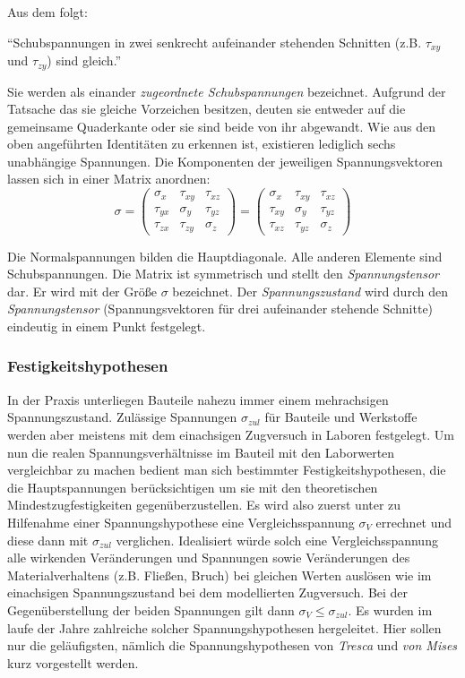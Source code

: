 \documentclass[12pt,a4paper,parskip,twoside,BCOR5mm,headsepline]{scrartcl}
\begin{document}
\begin{description*}
Aus dem folgt:

"`Schubspannungen in zwei senkrecht aufeinander stehenden Schnitten (z.B. $\tau_{xy}$ und $\tau_{zy}$) sind gleich."'\autocite[46]{tmr}

Sie werden als einander \emph{zugeordnete Schubspannungen} bezeichnet. Aufgrund der Tatsache das sie gleiche Vorzeichen besitzen, deuten sie entweder auf die gemeinsame Quaderkante oder sie sind beide von ihr abgewandt. Wie aus den oben angeführten Identitäten zu erkennen ist, existieren lediglich sechs unabhängige Spannungen. Die Komponenten der jeweiligen Spannungsvektoren lassen sich in einer Matrix anordnen:
\begin{equation}
\sigma = \begin{pmatrix}
\sigma_x & \tau_{xy} & \tau_{xz}\\
\tau_{yx} & \sigma_y & \tau_{yz}\\
\tau_{zx} & \tau_{zy} & \sigma_z
\end{pmatrix} = \begin{pmatrix}
\sigma_x & \tau_{xy} & \tau_{xz}\\
\tau_{xy} & \sigma_y & \tau_{yz}\\
\tau_{xz} & \tau_{yz} & \sigma_z
\end{pmatrix}
\end{equation}

Die Normalspannungen bilden die Hauptdiagonale. Alle anderen Elemente sind Schubspannungen. Die Matrix ist symmetrisch und stellt den \emph{Spannungstensor} dar. Er wird mit der Größe $ \sigma $ bezeichnet. Der \emph{Spannungszustand} wird durch den \emph{Spannungstensor} (Spannungsvektoren für drei aufeinander stehende Schnitte) eindeutig in einem Punkt festgelegt.\autocite[43-46]{tmr}
\subsubsection{Festigkeitshypothesen}
In der Praxis unterliegen Bauteile nahezu immer einem mehrachsigen Spannungszustand. Zulässige Spannungen $ \sigma_{zul} $ für Bauteile und Werkstoffe werden aber meistens mit dem einachsigen Zugversuch in Laboren festgelegt. Um nun die realen Spannungsverhältnisse im Bauteil mit den Laborwerten vergleichbar zu machen bedient man sich bestimmter Festigkeitshypothesen, die die Hauptspannungen berücksichtigen um sie mit den theoretischen Mindestzugfestigkeiten gegenüberzustellen. Es wird also zuerst unter zu Hilfenahme einer Spannungshypothese eine Vergleichsspannung $ \sigma_V $ errechnet  und diese dann mit $ \sigma_{zul} $ verglichen. Idealisiert würde solch eine Vergleichsspannung alle wirkenden Veränderungen und Spannungen sowie Veränderungen des Materialverhaltens (z.B. Fließen, Bruch) bei gleichen Werten auslösen wie im einachsigen Spannungszustand bei dem modellierten Zugversuch. Bei der Gegenüberstellung der beiden Spannungen gilt dann $ \sigma_V \leq \sigma_{zul} $. Es wurden im laufe der Jahre zahlreiche solcher Spannungshypothesen hergeleitet.\autocite[399]{dd} Hier sollen nur die geläufigsten, nämlich die Spannungshypothesen von  \emph{Tresca} und \emph{von Mises} kurz vorgestellt werden.


\end{description*}
\end{document}
